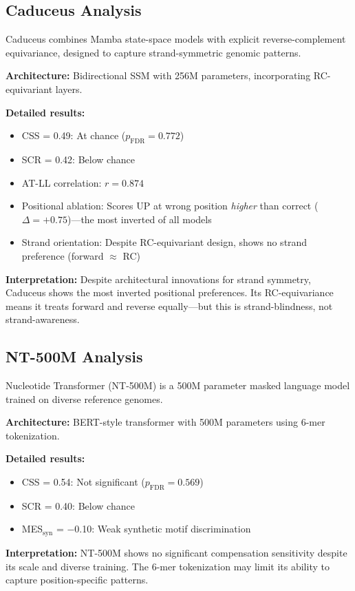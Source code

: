 \documentclass{article}
\begin{document}
\subsection{Caduceus Analysis}

Caduceus combines Mamba state-space models with explicit reverse-complement equivariance, designed to capture strand-symmetric genomic patterns.

\textbf{Architecture:} Bidirectional SSM with 256M parameters, incorporating RC-equivariant layers.

\textbf{Detailed results:}
\begin{itemize}
\item CSS = 0.49: At chance ($p_{\text{FDR}} = 0.772$)
\item SCR = 0.42: Below chance
\item AT-LL correlation: $r = 0.874$
\item Positional ablation: Scores UP at wrong position \textit{higher} than correct ($\Delta = +0.75$)---the most inverted of all models
\item Strand orientation: Despite RC-equivariant design, shows no strand preference (forward $\approx$ RC)
\end{itemize}

\textbf{Interpretation:} Despite architectural innovations for strand symmetry, Caduceus shows the most inverted positional preferences. Its RC-equivariance means it treats forward and reverse equally---but this is strand-blindness, not strand-awareness.

\subsection{NT-500M Analysis}

Nucleotide Transformer (NT-500M) is a 500M parameter masked language model trained on diverse reference genomes.

\textbf{Architecture:} BERT-style transformer with 500M parameters using 6-mer tokenization.

\textbf{Detailed results:}
\begin{itemize}
\item CSS = 0.54: Not significant ($p_{\text{FDR}} = 0.569$)
\item SCR = 0.40: Below chance
\item MES$_\text{syn}$ = $-$0.10: Weak synthetic motif discrimination
\end{itemize}

\textbf{Interpretation:} NT-500M shows no significant compensation sensitivity despite its scale and diverse training. The 6-mer tokenization may limit its ability to capture position-specific patterns.
\end{document}
